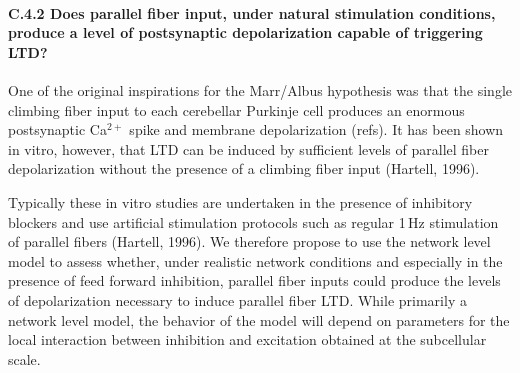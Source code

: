\documentclass[12pt]{article}
\begin{document}
{\paragraph{C.4.2 Does parallel fiber input, under natural stimulation conditions, produce a level of postsynaptic depolarization capable of triggering LTD?} One of the original inspirations for the Marr/Albus hypothesis was that the single climbing fiber input to each cerebellar Purkinje cell produces an enormous postsynaptic Ca$^{2+}$ spike and membrane depolarization (refs). It has been shown in vitro, however, that LTD can be induced by sufficient levels of parallel fiber depolarization without the presence of a climbing fiber input (Hartell, 1996).

Typically these in vitro studies are undertaken in the presence of inhibitory blockers and use artificial stimulation protocols such as regular 1\,Hz stimulation of parallel fibers  (Hartell, 1996). We therefore propose to use the network level model to assess whether, under realistic network conditions and especially in the presence of feed forward inhibition, parallel fiber inputs could produce the levels of depolarization necessary to induce parallel fiber LTD. While primarily a network level model, the behavior of the model will depend on parameters for the local interaction between inhibition and excitation obtained at the subcellular scale.

}
\end{document}
